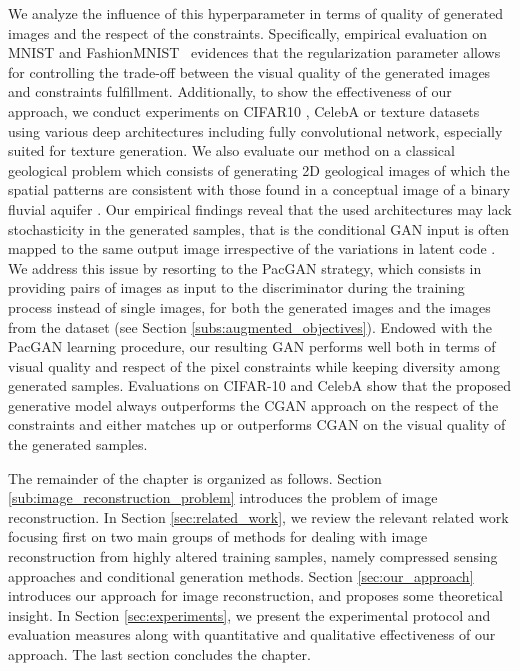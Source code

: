  We analyze the influence of this hyperparameter in terms of quality of generated images and the respect of the constraints. Specifically, empirical evaluation on MNIST \citep{LeCun1998a} and FashionMNIST~\citep{Xiao2017} evidences that the regularization parameter allows for controlling the trade-off between the visual quality of the generated images and constraints fulfillment.  Additionally, to show the effectiveness of our approach, we conduct experiments on CIFAR10 \citep{Krizhevsky2009}, CelebA \citep{Liu2015} or texture \citep{Jetchev2017} datasets using various deep architectures including fully convolutional network, especially suited for texture generation. We also evaluate our method on a classical geological problem which consists of generating 2D geological images of which the spatial patterns are consistent with those found in a conceptual image of a binary fluvial aquifer \citep{Strebelle2002, Laloy2018}. Our empirical findings reveal that the used architectures may lack stochasticity in the generated samples, that is the conditional GAN input is often mapped to the same output image irrespective of the variations in latent code \citep{Yang2019}. We address this issue by resorting to the PacGAN \citep{Lin2018} strategy, which consists in providing pairs of images as input to the discriminator during the training process instead of single images, for both the generated images and the images from the dataset (see Section \ref{subs:augmented_objectives}). Endowed with the PacGAN learning procedure, our resulting GAN performs well both in terms of visual quality and respect of the pixel constraints while keeping diversity among generated samples. Evaluations on CIFAR-10 and CelebA show that the proposed generative model always outperforms the \ac{CGAN} approach on the respect of the constraints and either matches up or outperforms \ac{CGAN} on the visual quality of the generated samples.

The remainder of the chapter is organized as follows. Section \ref{sub:image_reconstruction_problem} introduces the problem of image reconstruction. In Section \ref{sec:related_work}, we review the relevant related  work focusing first on two main groups of methods for dealing with image reconstruction from highly altered training samples, namely compressed sensing \citep{Candes2005} approaches and conditional generation methods. Section \ref{sec:our_approach} introduces our approach for image reconstruction, and proposes some theoretical insight. In Section \ref{sec:experiments}, we present the experimental protocol and evaluation measures along with quantitative and qualitative effectiveness of our approach. The last section concludes the chapter.

